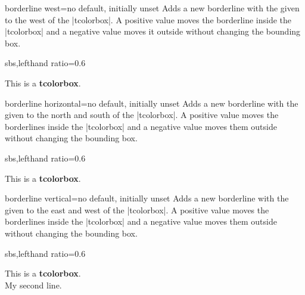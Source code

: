 \begin{docTcbKey}[][doc new=2014-10-20]{borderline west}{=}{no default, initially unset}
  Adds a new borderline with the given  to the
  west of the |tcolorbox|.
  A positive  value
  moves the borderline inside the |tcolorbox| and a negative  value
  moves it outside without changing the bounding box.
\begin{dispExample*}{sbs,lefthand ratio=0.6}
\begin{tcolorbox}[enhanced,
  borderline west={2pt}{-2pt}{red}]
  This is a \textbf{tcolorbox}.
\end{tcolorbox}
\end{dispExample*}
\end{docTcbKey}

\clearpage
\begin{docTcbKey}[][doc new=2014-10-20]{borderline horizontal}{=}{no default, initially unset}
  Adds a new borderline with the given  to the
  north and south of the |tcolorbox|.
  A positive  value
  moves the borderlines inside the |tcolorbox| and a negative  value
  moves them outside without changing the bounding box.
\begin{dispExample*}{sbs,lefthand ratio=0.6}
\begin{tcolorbox}[blanker,top=3mm,bottom=3mm,
   borderline horizontal={2pt}{0pt}{red}]
  This is a \textbf{tcolorbox}.
\end{tcolorbox}
\end{dispExample*}
\end{docTcbKey}


\begin{docTcbKey}[][doc new=2014-10-20]{borderline vertical}{=}{no default, initially unset}
  Adds a new borderline with the given  to the
  east and west of the |tcolorbox|.
  A positive  value
  moves the borderlines inside the |tcolorbox| and a negative  value
  moves them outside without changing the bounding box.
\begin{dispExample*}{sbs,lefthand ratio=0.6}
\begin{tcolorbox}[blanker,left=3mm,right=3mm,
   borderline vertical={2pt}{0pt}{red}]
  This is a \textbf{tcolorbox}.\\
  My second line.
\end{tcolorbox}
\end{dispExample*}
\end{docTcbKey}

